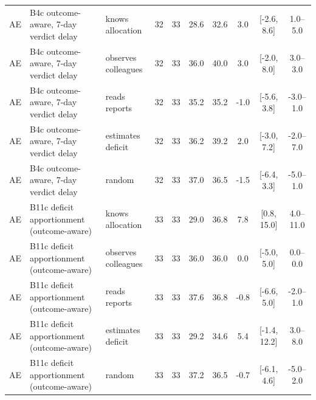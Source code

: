 \begin{table}[!t]
\begin{tabular}{lllccccccc}
AE & B4c outcome-aware, 7-day verdict delay & knows allocation & 32 & 33 & 28.6 & 32.6 & 3.0 & [-2.6, 8.6] & 1.0--5.0 \\
AE & B4c outcome-aware, 7-day verdict delay & observes colleagues & 32 & 33 & 36.0 & 40.0 & 3.0 & [-2.0, 8.0] & 3.0--3.0 \\
AE & B4c outcome-aware, 7-day verdict delay & reads reports & 32 & 33 & 35.2 & 35.2 & -1.0 & [-5.6, 3.8] & -3.0--1.0 \\
AE & B4c outcome-aware, 7-day verdict delay & estimates deficit & 32 & 33 & 36.2 & 39.2 & 2.0 & [-3.0, 7.2] & -2.0--7.0 \\
AE & B4c outcome-aware, 7-day verdict delay & random & 32 & 33 & 37.0 & 36.5 & -1.5 & [-6.4, 3.3] & -5.0--1.0 \\
AE & B11c deficit apportionment (outcome-aware) & knows allocation & 33 & 33 & 29.0 & 36.8 & 7.8 & [0.8, 15.0] & 4.0--11.0 \\
AE & B11c deficit apportionment (outcome-aware) & observes colleagues & 33 & 33 & 36.0 & 36.0 & 0.0 & [-5.0, 5.0] & 0.0--0.0 \\
AE & B11c deficit apportionment (outcome-aware) & reads reports & 33 & 33 & 37.6 & 36.8 & -0.8 & [-6.6, 5.0] & -2.0--1.0 \\
AE & B11c deficit apportionment (outcome-aware) & estimates deficit & 33 & 33 & 29.2 & 34.6 & 5.4 & [-1.4, 12.2] & 3.0--8.0 \\
AE & B11c deficit apportionment (outcome-aware) & random & 33 & 33 & 37.2 & 36.5 & -0.7 & [-6.1, 4.6] & -5.0--2.0 \\
\bottomrule
\end{tabular}
\end{table}

